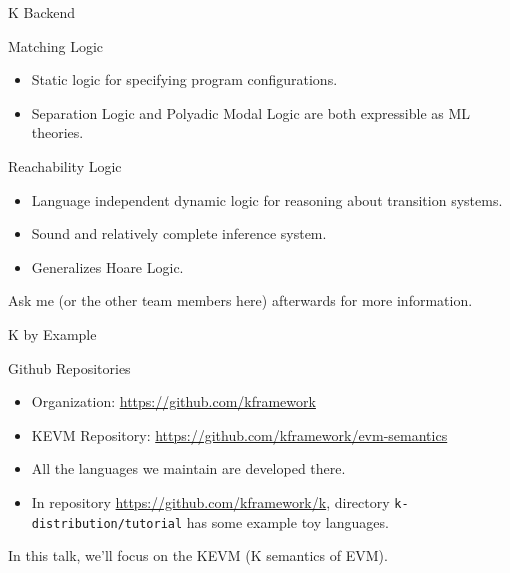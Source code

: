 \documentclass[8pt,ignorenonframetext,]{beamer}
\providecommand{\tightlist}{%
  \setlength{\itemsep}{0pt}\setlength{\parskip}{0pt}}
\begin{document}
\begin{frame}{K Backend}

\pause

\begin{block}{Matching Logic}

\begin{itemize}
\tightlist
\item
  Static logic for specifying program configurations.
\item
  Separation Logic and Polyadic Modal Logic are both expressible as ML
  theories.
\end{itemize}

\pause

\end{block}

\begin{block}{Reachability Logic}

\begin{itemize}
\tightlist
\item
  Language independent dynamic logic for reasoning about transition
  systems.
\item
  Sound and relatively complete inference system.
\item
  Generalizes Hoare Logic.
\end{itemize}

\pause

Ask me (or the other team members here) afterwards for more information.

\end{block}

\end{frame}

\begin{frame}[fragile]{K by Example}

\pause

\begin{block}{Github Repositories}

\begin{itemize}
\tightlist
\item
  Organization: \url{https://github.com/kframework}
\item
  KEVM Repository: \url{https://github.com/kframework/evm-semantics}
\item
  All the languages we maintain are developed there.
\item
  In repository \url{https://github.com/kframework/k}, directory
  \texttt{k-distribution/tutorial} has some example toy languages.
\end{itemize}

\pause

In this talk, we'll focus on the KEVM (K semantics of EVM).

\end{block}

\end{frame}
\end{document}

